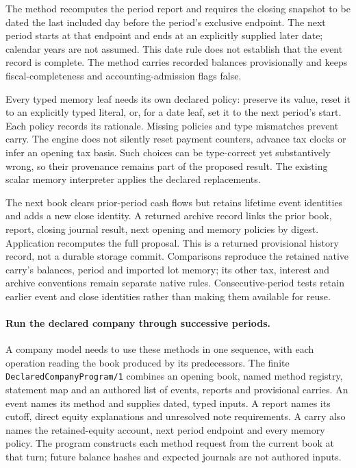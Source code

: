 The method recomputes the period report and requires the closing snapshot to be
dated the last included day before the period's exclusive endpoint. The next
period starts at that endpoint and ends at an explicitly supplied later date;
calendar years are not assumed. This date rule does not establish that the event
record is complete. The method carries recorded balances provisionally and keeps
fiscal-completeness and accounting-admission flags false.

Every typed memory leaf needs its own declared policy: preserve its value, reset
it to an explicitly typed literal, or, for a date leaf, set it to the next period's
start. Each policy records its rationale. Missing policies and type mismatches
prevent carry. The engine does not silently reset payment counters, advance tax
clocks or infer an opening tax basis. Such choices can be type-correct yet
substantively wrong, so their provenance remains part of the proposed result.
The existing scalar memory interpreter applies the declared replacements.

The next book clears prior-period cash flows but retains lifetime event identities
and adds a new close identity. A returned archive record links the prior book,
report, closing journal result, next opening and memory policies by digest.
Application recomputes the full proposal. This is a returned provisional history
record, not a durable storage commit. Comparisons reproduce the retained native
carry's balances, period and imported lot memory; its other tax, interest and
archive conventions remain separate native rules. Consecutive-period tests retain
earlier event and close identities rather than making them available for reuse.

\paragraph{Run the declared company through successive periods.}
A company model needs to use these methods in one sequence, with each operation
reading the book produced by its predecessors. The finite
\texttt{DeclaredCompanyProgram/1} combines an opening book, named method registry,
statement map and an authored list of events, reports and provisional carries.
An event names its method and supplies dated, typed inputs. A report names its
cutoff, direct equity explanations and unresolved note requirements. A carry also
names the retained-equity account, next period endpoint and every memory policy.
The program constructs each method request from the current book at that turn;
future balance hashes and expected journals are not authored inputs.

